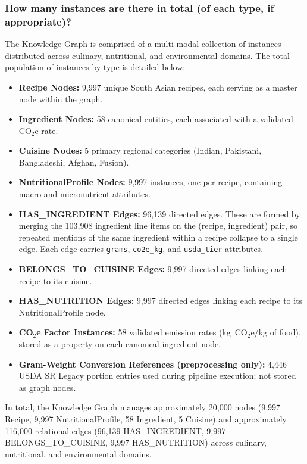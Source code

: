 \documentclass{article}
\newcommand{\question}[1]{#1}
\begin{document}
\question{\subsubsection*{How many instances are there in total (of each type, if appropriate)?}}

The Knowledge Graph is comprised of a multi-modal collection of instances distributed
across culinary, nutritional, and environmental domains. The total population of instances
by type is detailed below:

\begin{itemize}
    \item \textbf{Recipe Nodes:} 9,997 unique South Asian recipes, each serving as a
    master node within the graph.
    \item \textbf{Ingredient Nodes:} 58 canonical entities, each associated with a
    validated CO$_2$e rate.
    \item \textbf{Cuisine Nodes:} 5 primary regional categories (Indian,
    Pakistani, Bangladeshi, Afghan, Fusion).
    \item \textbf{NutritionalProfile Nodes:} 9,997 instances, one per recipe,
    containing macro and micronutrient attributes.
    \item \textbf{HAS\_INGREDIENT Edges:} 96,139 directed edges. These are formed by
    merging the 103,908 ingredient line items on the (recipe, ingredient) pair, so
    repeated mentions of the same ingredient within a recipe collapse to a single edge.
    Each edge carries \texttt{grams}, \texttt{co2e\_kg}, and \texttt{usda\_tier} attributes.
    \item \textbf{BELONGS\_TO\_CUISINE Edges:} 9,997 directed edges linking each recipe
    to its cuisine.
    \item \textbf{HAS\_NUTRITION Edges:} 9,997 directed edges linking each recipe to its
    NutritionalProfile node.
    \item \textbf{CO$_2$e Factor Instances:} 58 validated emission rates
    (kg~CO$_2$e/kg of food), stored as a property on each canonical ingredient node.
    \item \textbf{Gram-Weight Conversion References (preprocessing only):} 4,446
    USDA SR Legacy portion entries used during pipeline execution; not stored as
    graph nodes.
\end{itemize}

In total, the Knowledge Graph manages approximately 20,000 nodes (9,997 Recipe,
9,997 NutritionalProfile, 58 Ingredient, 5 Cuisine) and approximately 116,000
relational edges (96,139 HAS\_INGREDIENT, 9,997 BELONGS\_TO\_CUISINE, 9,997
HAS\_NUTRITION) across culinary, nutritional, and environmental domains.
\end{document}
